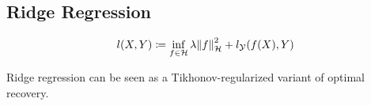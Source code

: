 \subsection{Ridge Regression}

\begin{equation}
	\label{eq:ridge-regression-loss}
	l(X, Y) \coloneqq \inf_{f \in \mathcal{H}} \lambda \norm{f}_\mathcal{H}^2 
	+ l_{\mathcal{Y}} (f(X), Y)
\end{equation}

Ridge regression can be seen as a Tikhonov-regularized variant of optimal recovery.